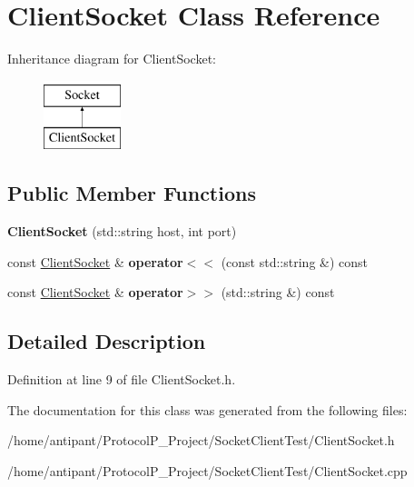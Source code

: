 \hypertarget{classClientSocket}{\section{Client\-Socket Class Reference}
\label{classClientSocket}
}
Inheritance diagram for Client\-Socket\-:\begin{figure}[H]
\begin{center}
\leavevmode
\includegraphics[height=2.000000cm]{classClientSocket}
\end{center}
\end{figure}
\subsection*{Public Member Functions}
\begin{DoxyCompactItemize}
\item 
\hypertarget{classClientSocket_a02809f0ffec549af450364df54175cce}{{\bfseries Client\-Socket} (std\-::string host, int port)}\label{classClientSocket_a02809f0ffec549af450364df54175cce}

\item 
\hypertarget{classClientSocket_a2fe5c2037ee6bdcc4d578db1111928ba}{const \hyperlink{classClientSocket}{Client\-Socket} \& {\bfseries operator$<$$<$} (const std\-::string \&) const }\label{classClientSocket_a2fe5c2037ee6bdcc4d578db1111928ba}

\item 
\hypertarget{classClientSocket_a6cb39e9222b501c8b070de60ef6b5fbc}{const \hyperlink{classClientSocket}{Client\-Socket} \& {\bfseries operator$>$$>$} (std\-::string \&) const }\label{classClientSocket_a6cb39e9222b501c8b070de60ef6b5fbc}

\end{DoxyCompactItemize}


\subsection{Detailed Description}


Definition at line 9 of file Client\-Socket.\-h.



The documentation for this class was generated from the following files\-:\begin{DoxyCompactItemize}
\item 
/home/antipant/\-Protocol\-P\-\_\-\-Project/\-Socket\-Client\-Test/Client\-Socket.\-h\item 
/home/antipant/\-Protocol\-P\-\_\-\-Project/\-Socket\-Client\-Test/Client\-Socket.\-cpp\end{DoxyCompactItemize}
